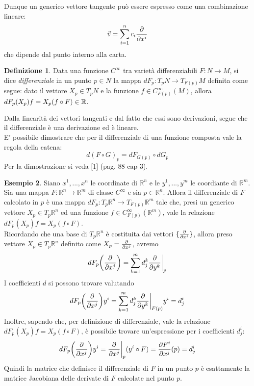 \documentclass[12pt,a4paper]{report}
\theoremstyle{definition}
\newtheorem{Def}{Definizione}[chapter]
\theoremstyle{definition}
\newtheorem{Ex}[Def]{Esempio}
\theoremstyle{definition}
\theoremstyle{definition}
\begin{document}
Dunque un generico vettore tangente può essere espresso come una combinazione lineare: $$\vec{v}=\sum_{i=1}^{n}c_i{\partial\over \partial x^i}$$ che dipende dal punto interno alla carta.
\begin{Def}
	Data una funzione $C^\infty$ tra varietà differenziabili $F:N\rightarrow M$, si dice \textit{differenziale} in un punto $p\in N$ la mappa $dF_p:T_pN\rightarrow T_{F(p)}M$ definita come segue: dato il vettore $X_p\in T_pN$ e la funzione $f\in C_{F(p)}^\infty(M)$, allora $dF_p(X_p)f=\\X_p(f\circ F)\in\mathbb{R}$.
\end{Def}
Dalla linearità dei vettori tangenti e dal fatto che essi sono derivazioni, segue che il differenziale è una derivazione ed è lineare. \\
E' possibile dimostrare che per il differenziale di una funzione composta vale la regola della catena: $$d(F\circ G)_p=dF_{G(p)}\circ dG_p$$ Per la dimostrazione si veda [1] (pag. 88 cap 3).
\begin{Ex}
	Siano $x^1,...,x^n$ le coordinate di $\mathbb{R}^n$ e le $y^1,...,y^m$ le coordiante di $\mathbb{R}^m$. Sia una mappa $F:\mathbb{R}^n\rightarrow \mathbb{R}^m$ di classe $C^\infty$ e sia $p\in \mathbb{R}^n$. Allora il differenziale di $F$ calcolato in $p$ è una mappa $dF_p:T_p\mathbb{R}^n\rightarrow T_{F(p)}\mathbb{R}^m$ tale che, presi un generico vettore $X_p\in T_p\mathbb{R}^n$ ed una funzione $f\in C_{F(p)}^\infty(\mathbb{R}^m)$, vale la relazione $dF_p(X_p)f=X_p(f\circ F)$.\\
	Ricordando che una base di $T_p\mathbb{R}^n$ è costituita dai vettori $\{{\partial\over\partial x^i}\}$, allora preso vettore $X_p\in T_p\mathbb{R}^n$ definito come $X_p={\partial\over \partial x^j}$, avremo $$dF_p\bigg{(}{\partial\over \partial x^j}\bigg{)}=\sum_{k=1}^{m}d_j^k{\partial\over \partial y^k}\bigg{\rvert}_p$$
	I coefficienti $d$ si possono trovare valutando 
	$$dF_p\bigg{(}{\partial\over \partial x^j}\bigg{)}y^i=\sum_{k=1}^{m}d_j^k{\partial\over \partial y^k}\bigg{\rvert}_{F(p)}y^i=d_j^i$$
	Inoltre, sapendo che, per definizione di differenziale, vale la relazione $dF_p(X_p)f=X_p(f\circ F)$, è possibile trovare un'espressione per i coefficienti $d_j^i$:
	$$dF_p\bigg{(}{\partial\over \partial x^j}\bigg{)}y^i={\partial\over \partial x^j}\bigg{\rvert}_p(y^i\circ F)={\partial F^i\over \partial x^j}(p)=d^i_j$$
	Quindi la matrice che definisce il differenziale di $F$ in un punto $p$ è esattamente la matrice Jacobiana delle derivate di $F$ calcolate nel punto $p$.
\end{Ex}
\end{document}
